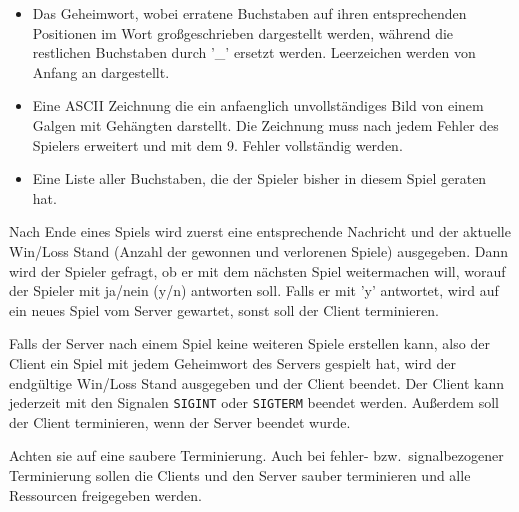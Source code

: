 \begin{itemize}
  \item Das Geheimwort, wobei erratene Buchstaben auf ihren entsprechenden
        Positionen im Wort großgeschrieben dargestellt werden, während die
        restlichen Buchstaben durch '\_' ersetzt werden.
        Leerzeichen werden von Anfang an dargestellt.
  \item Eine ASCII Zeichnung die ein anfaenglich unvollständiges Bild von einem
        Galgen mit Gehängten darstellt. Die Zeichnung muss nach jedem Fehler
        des Spielers erweitert und mit dem 9. Fehler vollständig werden.
  \item Eine Liste aller Buchstaben, die der Spieler bisher in diesem Spiel
        geraten hat.
\end{itemize}

Nach Ende eines Spiels wird zuerst eine entsprechende Nachricht und der
aktuelle Win/Loss Stand (Anzahl der gewonnen und verlorenen Spiele)
ausgegeben. Dann wird der Spieler gefragt, ob er mit dem nächsten Spiel
weitermachen will, worauf der Spieler mit ja/nein (y/n) antworten soll. Falls
er mit 'y' antwortet, wird auf ein neues Spiel vom Server gewartet, sonst soll
der Client terminieren.

Falls der Server nach einem Spiel keine weiteren Spiele erstellen kann, also
der Client ein Spiel mit jedem Geheimwort des Servers gespielt hat, wird der
endgültige Win/Loss Stand ausgegeben und der Client beendet. Der Client kann
jederzeit mit den Signalen \verb|SIGINT| oder \verb|SIGTERM| beendet werden.
Außerdem soll der Client terminieren, wenn der Server beendet wurde.


Achten sie auf eine saubere Terminierung.
Auch bei fehler- bzw.\ signalbezogener Terminierung sollen die Clients
und den Server sauber terminieren und alle Ressourcen freigegeben werden.

\osueguidelinesthree


